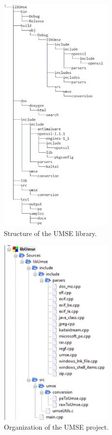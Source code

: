 \begin{figure}
  \centering
  \includegraphics[width=0.5\textwidth]{./figures/UMSELibrary}
  \caption{\label{fig:UMSELibrary} Structure of the UMSE library.}
\end{figure}
\begin{figure}
  \centering
  \includegraphics[width=0.5\textwidth]{./figures/UMSEProject}
  \caption{\label{fig:UMSELibrary} Organization of the UMSE project.}
\end{figure}

